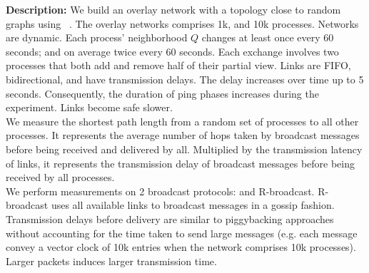 \noindent \textbf{Description:} We build an overlay network with a topology
close to random graphs using \SPRAY~\cite{nedelec2017adaptive}. The overlay
networks comprises 1k, and 10k processes. Networks are dynamic. Each process'
neighborhood $Q$ changes at least once every 60 seconds; and on average twice
every 60 seconds. Each exchange involves two processes that both add and remove
half of their partial view.  Links are FIFO, bidirectional, and have
transmission delays. The delay increases over time up to 5 seconds.
Consequently, the duration of ping phases increases during the experiment.
Links become safe slower. \\
We measure the shortest path length from a random set of processes to all other
processes. It represents the average number of hops taken by broadcast messages
before being received and delivered by all.
Multiplied by the transmission latency of links, it represents the transmission
delay of broadcast
messages before being received by all processes. \\
We perform measurements on 2 broadcast protocols: \CBROADCAST and R-broadcast.
R-broadcast uses all available links to broadcast messages in a gossip fashion.
Transmission delays before delivery are similar to piggybacking
approaches~\cite{almeida2008interval,fidge1988timestamps,mattern1989virtual,singhal1992efficient}~\cite{birman1987reliable,hadzilacos1993fault,mostefaoui2017probabilistic}
without accounting for the time taken to send large messages (e.g. each message
convey a vector clock of 10k entries when the network comprises 10k processes).
Larger packets induces larger transmission time.

